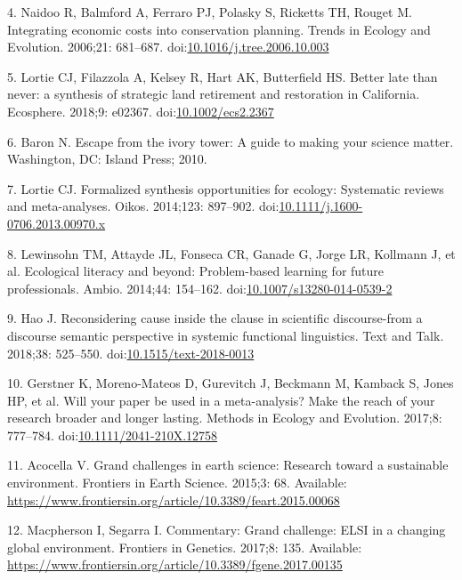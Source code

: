 \documentclass[10pt,letterpaper]{article}
\begin{document}
\hypertarget{ref-Naidoo2006}{}
4. Naidoo R, Balmford A, Ferraro PJ, Polasky S, Ricketts TH, Rouget M.
Integrating economic costs into conservation planning. Trends in Ecology
and Evolution. 2006;21: 681--687.
doi:\href{https://doi.org/10.1016/j.tree.2006.10.003}{10.1016/j.tree.2006.10.003}

\hypertarget{ref-Lortie2018}{}
5. Lortie CJ, Filazzola A, Kelsey R, Hart AK, Butterfield HS. Better
late than never: a synthesis of strategic land retirement and
restoration in California. Ecosphere. 2018;9: e02367.
doi:\href{https://doi.org/10.1002/ecs2.2367}{10.1002/ecs2.2367}

\hypertarget{ref-Baron2010}{}
6. Baron N. Escape from the ivory tower: A guide to making your science
matter. Washington, DC: Island Press; 2010.

\hypertarget{ref-Lortie2014}{}
7. Lortie CJ. Formalized synthesis opportunities for ecology: Systematic
reviews and meta-analyses. Oikos. 2014;123: 897--902.
doi:\href{https://doi.org/10.1111/j.1600-0706.2013.00970.x}{10.1111/j.1600-0706.2013.00970.x}

\hypertarget{ref-Lewinsohn2014}{}
8. Lewinsohn TM, Attayde JL, Fonseca CR, Ganade G, Jorge LR, Kollmann J,
et al. Ecological literacy and beyond: Problem-based learning for future
professionals. Ambio. 2014;44: 154--162.
doi:\href{https://doi.org/10.1007/s13280-014-0539-2}{10.1007/s13280-014-0539-2}

\hypertarget{ref-Hao2018}{}
9. Hao J. Reconsidering cause inside the clause in scientific
discourse-from a discourse semantic perspective in systemic functional
linguistics. Text and Talk. 2018;38: 525--550.
doi:\href{https://doi.org/10.1515/text-2018-0013}{10.1515/text-2018-0013}

\hypertarget{ref-Gerstner2017}{}
10. Gerstner K, Moreno-Mateos D, Gurevitch J, Beckmann M, Kamback S,
Jones HP, et al. Will your paper be used in a meta-analysis? Make the
reach of your research broader and longer lasting. Methods in Ecology
and Evolution. 2017;8: 777--784.
doi:\href{https://doi.org/10.1111/2041-210X.12758}{10.1111/2041-210X.12758}

\hypertarget{ref-Acocella2015}{}
11. Acocella V. Grand challenges in earth science: Research toward a
sustainable environment. Frontiers in Earth Science. 2015;3: 68.
Available:
\url{https://www.frontiersin.org/article/10.3389/feart.2015.00068}

\hypertarget{ref-Macpherson2017}{}
12. Macpherson I, Segarra I. Commentary: Grand challenge: ELSI in a
changing global environment. Frontiers in Genetics. 2017;8: 135.
Available:
\url{https://www.frontiersin.org/article/10.3389/fgene.2017.00135}
\end{document}
